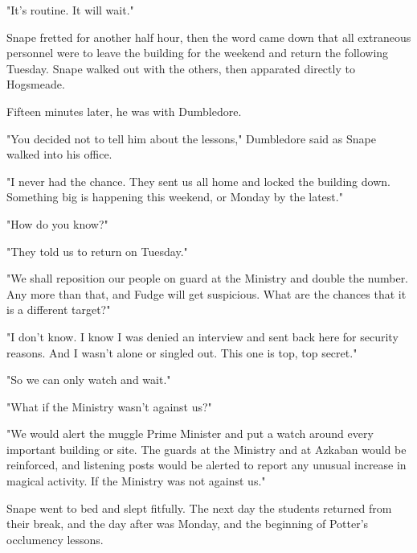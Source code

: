 "It's routine. It will wait."

Snape fretted for another half hour, then the word came down that all extraneous personnel were to leave the building for the weekend and return the following Tuesday. Snape walked out with the others, then apparated directly to Hogsmeade.

Fifteen minutes later, he was with Dumbledore.

"You decided not to tell him about the lessons," Dumbledore said as Snape walked into his office.

"I never had the chance. They sent us all home and locked the building down. Something big is happening this weekend, or Monday by the latest."

"How do you know?"

"They told us to return on Tuesday."

"We shall reposition our people on guard at the Ministry and double the number. Any more than that, and Fudge will get suspicious. What are the chances that it is a different target?"

"I don't know. I know I was denied an interview and sent back here for security reasons. And I wasn't alone or singled out. This one is top, top secret."

"So we can only watch and wait."

"What if the Ministry wasn't against us?"

"We would alert the muggle Prime Minister and put a watch around every important building or site. The guards at the Ministry and at Azkaban would be reinforced, and listening posts would be alerted to report any unusual increase in magical activity. If the Ministry was not against us."

Snape went to bed and slept fitfully. The next day the students returned from their break, and the day after was Monday, and the beginning of Potter's occlumency lessons.


